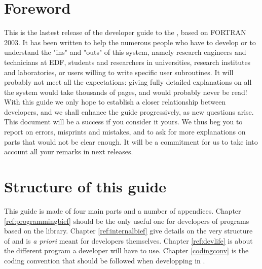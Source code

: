 %
\chapter{Foreword}
%
%
This is the lastest release of the developer guide to the \telemacsystem, based
on FORTRAN 2003. It has been written to help the numerous people who have to
develop or to understand the "ins" and "outs" of this system, namely research
engineers and technicians at EDF, students and researchers in universities,
research institutes and laboratories, or users willing to write specific user
subroutines. It will probably not meet all the expectations: giving fully
detailed explanations on all the system would take thousands of pages, and
would probably never be read! With this guide we only hope to establish a
closer relationship between developers, and we shall enhance the guide
progressively, as new questions arise. This document will be a success if you
consider it yours. We thus beg you to report on errors, misprints and mistakes,
and to ask for more explanations on parts that would not be clear enough. It
will be a commitment for us to take into account all your remarks in next
releases.
%
%
\chapter{Structure of this guide}
%
%
This guide is made of four main parts and a number of appendices. Chapter
\ref{ref:programmingbief} should be the only useful one for developers of
programs based on the \bief library.  Chapter \ref{ref:internalbief} give
details on the very structure of \bief and is \textit{a priori} meant for \bief
developers themselves. Chapter \ref{ref:devlife} is about the different program
a developer will have to use. Chapter \ref{codingconv} is the coding convention
that should be followed when developping in \telemacsystem.
